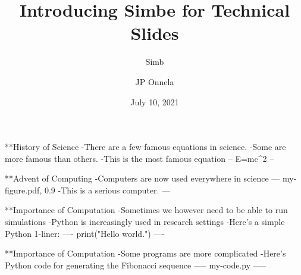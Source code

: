 
\title[SimBe]{Introducing Simbe for Technical Slides}
\subtitle{Simb}
\author[JP Onnela]{JP Onnela}
\date[July 10, 2021]{July 10, 2021}
\frame{\titlepage}

**History of Science
-There are a few famous equations in science.
  -Some are more famous than others.
-This is the most famous equation
--
E=mc^2
--

**Advent of Computing
-Computers are now used everywhere in science
---
my-figure.pdf, 0.9
-This is a serious computer.
---

**Importance of Computation
-Sometimes we however need to be able to run simulations
-Python is increasingly used in research settings
-Here's a simple Python 1-liner:
----
print("Hello world.")
----

**Importance of Computation
-Some programs are more complicated
-Here's Python code for generating the Fibonacci sequence
-----
my-code.py
-----

